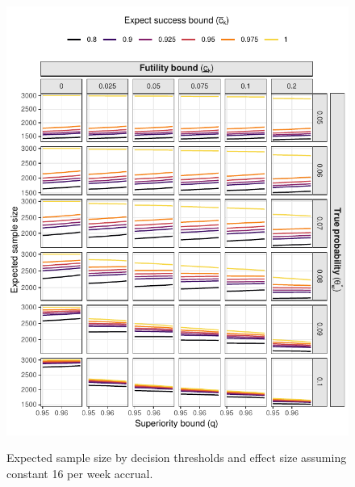 \documentclass{bmcart}
\begin{document}
\begin{figure}[!ht]
	\caption{Expected sample size by decision thresholds and effect size assuming constant 16 per week accrual.}
	\includegraphics{expected_ss_16.pdf}
	\label{fig:expected_ss_16}
\end{figure}
\end{document}
